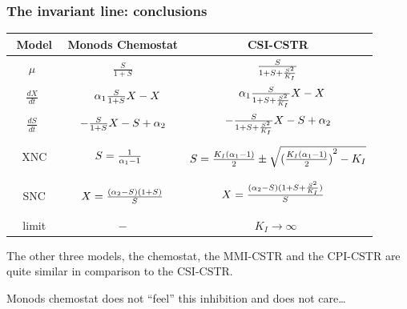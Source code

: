 \documentclass[a4paper, 10pt, twoside, openright]{book}
\begin{document}
\subsubsection*{The invariant line: conclusions}



\begin{tabular}{|c|c|c|} \hline %
$\phantom{\Bigg(}$Model$\phantom{\Bigg(}$ & Monods Chemostat & CSI-CSTR \\ 
\hline %
\rowcolor{bluegray}
$\mu\phantom{\Bigg(}$
& $\frac{ S} {1+S}$
& $\frac{ S} {1+S+\frac{{S}^{2}}{{K}_{I}}}$ \\ %
$\frac{dX}{dt} \phantom{\Bigg(}$ 
& $\phantom{-}{\alpha}_{1}\frac{ S}{1+S}X-X$        
& $\phantom{-}{\alpha}_{1}\frac{ S}{1+S+\frac{{S}^{2}}{{K}_{I}}}X-X $  \\
$\frac{dS}{dt} \phantom{\Bigg)}$ 
& $-\frac{S} {1+S}X-S+{\alpha}_{2} $        
& $-\frac{S} {1+S+\frac{{S}^{2}}{{K}_{I}}}X-S+{\alpha}_{2}$        \\ %
XNC%
& $S=\frac{1}{{\alpha}_{1} - 1} \phantom{\Bigg(}$
& $S=\frac{{K}_{I}({\alpha}_{1}-1)}{2}\pm\sqrt{{(\frac{{K}_{I}({\alpha}_{1}-1)}{2})}^{2}-{K}_{I}}$ \\
SNC%
& $ X= \frac{ ({\alpha}_{2}-S)(1+S) }  { S }$ 
& $ X=
\frac{({\alpha}_{2}-S)(1+S+\frac{{S}^{2}}{{K}_{I}})}{S}\phantom{\Bigg(} $\\ 
limit%
& $-$
& $ K_I \rightarrow \infty\phantom{\Bigg(}$  \\ \hline 
\end{tabular}




The other three models, the chemostat, the MMI-CSTR and the CPI-CSTR
are quite similar in comparison to the CSI-CSTR. 

Monods chemostat does not ``feel'' this inhibition and does not care\ldots 


\end{document}
